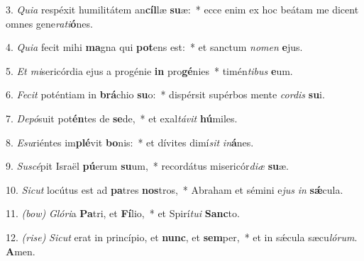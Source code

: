 3. \textit{Quia} respéxit humilitátem an\textbf{cíl}læ \textbf{su}æ:~* ecce enim ex hoc beátam me dicent omnes gene\textit{ra}\textit{ti}\textbf{ó}nes.

4. \textit{Quia} fecit mihi \textbf{ma}gna qui \textbf{pot}ens est:~* et sanctum \textit{no}\textit{men} \textbf{e}jus.

5. \textit{Et mi}sericórdia ejus a progénie \textbf{in} pro\textbf{gé}nies~* timén\textit{ti}\textit{bus} \textbf{e}um.

6. \textit{Fecit} poténtiam in \textbf{brá}chio \textbf{su}o:~* dispérsit supérbos mente \textit{cor}\textit{dis} \textbf{su}i.

7. \textit{Depó}suit pot\textbf{én}tes de \textbf{se}de,~* et exal\textit{tá}\textit{vit} \textbf{hú}miles.

8. \textit{Esu}riéntes im\textbf{plé}vit \textbf{bo}nis:~* et dívites dimí\textit{sit} \textit{in}\textbf{á}nes.

9. \textit{Suscé}pit Israël \textbf{pú}erum \textbf{su}um,~* recordátus misericór\textit{di}\textit{æ} \textbf{su}æ.

10. \textit{Sicut} locútus est ad \textbf{pa}tres \textbf{nos}tros,~* Abraham et sémini e\textit{jus} \textit{in} \textbf{s\'{\ae}}cula.

11. {\color{red}\textit{(bow)}} \textit{Glóri}a \textbf{Pa}tri, et \textbf{Fí}lio,~* et Spirí\textit{tu}\textit{i} \textbf{Sanc}to.

12. {\color{red}\textit{(rise)}} \textit{Sicut} erat in princípio, et \textbf{nunc}, et \textbf{sem}per,~* et in s\'{\ae}cula sæcu\textit{ló}\textit{rum}. \textbf{A}men.
